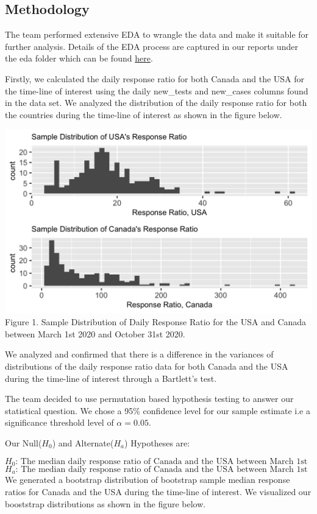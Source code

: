 \documentclass[
]{article}
\begin{document}
\hypertarget{methodology}{%
\subsection{Methodology}\label{methodology}}

The team performed extensive EDA to wrangle the data and make it
suitable for further analysis. Details of the EDA process are captured
in our reports under the eda folder which can be found
\href{https://github.com/UBC-MDS/covid-19-cases-vs-tests-analysis/tree/main/eda}{here}.

Firstly, we calculated the daily response ratio for both Canada and the
USA for the time-line of interest using the daily new\_tests and
new\_cases columns found in the data set. We analyzed the distribution
of the daily response ratio for both the countries during the time-line
of interest as shown in the figure below.

\includegraphics{../results/histogram_plot.png} Figure 1. Sample
Distribution of Daily Response Ratio for the USA and Canada between
March 1st 2020 and October 31st 2020.

We analyzed and confirmed that there is a difference in the variances of
distributions of the daily response ratio data for both Canada and the
USA during the time-line of interest through a Bartlett's test.

The team decided to use permutation based hypothesis testing to answer
our statistical question. We chose a 95\% confidence level for our
sample estimate i.e a significance threshold level of
\({\alpha = 0.05}\).

Our Null(\(H_0\)) and Alternate(\(H_a\)) Hypotheses are:

\[ \text {$H_0$: The median daily response ratio of Canada and the USA between March 1st 2020 and October 31st 2020 is equal} \]
\[ \text {$H_a$: The median daily response ratio of Canada and the USA between March 1st 2020 and October 31st 2020 is not equal} \]
We generated a bootstrap distribution of bootstrap sample median
response ratios for Canada and the USA during the time-line of interest.
We visualized our booststrap distributions as shown in the figure below.
\end{document}
